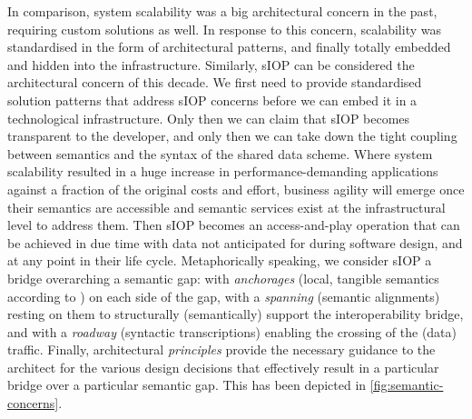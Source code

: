 \documentclass[sort&compress,preprint,authoryear,3p,twocolumn]{elsarticle}
\begin{document}
In comparison, system scalability was a big architectural concern in the
past, requiring custom solutions as well. In response to this concern,
scalability was standardised in the form of architectural patterns, and
finally totally embedded and hidden into the infrastructure. Similarly,
sIOP can be considered the architectural concern of this decade. We
first need to provide standardised solution patterns that address sIOP
concerns before we can embed it in a technological infrastructure. Only
then we can claim that sIOP becomes transparent to the developer, and
only then we can take down the tight coupling between semantics and the
syntax of the shared data scheme. Where system scalability resulted in a
huge increase in performance-demanding applications against a fraction
of the original costs and effort, business agility will emerge once
their semantics are accessible and semantic services exist at the
infrastructural level to address them. Then sIOP becomes an
access-and-play operation that can be achieved in due time with data not
anticipated for during software design, and at any point in their life
cycle. Metaphorically speaking, we consider sIOP a bridge overarching a
semantic gap: with \emph{anchorages} (local, tangible semantics
according to \citep{Brandt2021a}) on each side of the gap, with a
\emph{spanning} (semantic alignments) resting on them to structurally
(semantically) support the interoperability bridge, and with a
\emph{roadway} (syntactic transcriptions) enabling the crossing of the
(data) traffic. Finally, architectural \emph{principles} provide the
necessary guidance to the architect for the various design decisions
that effectively result in a particular bridge over a particular
semantic gap. This has been depicted in \cref{fig:semantic-concerns}.
\end{document}
